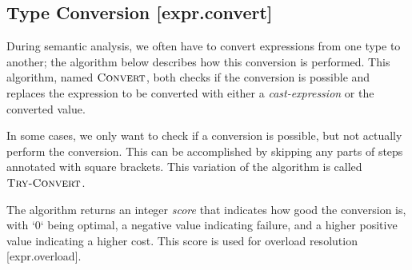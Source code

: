 \documentclass[a4paper, 12pt, oneside, final]{article}
\def\alg#1{\ensuremath{\text{\scshape #1}}}
\def\sref[#1]{[#1]}
\begin{document}
\subsection{Type Conversion [expr.convert]}
During semantic analysis, we often have to convert expressions from one type to another; the algorithm below
describes how this conversion is performed. This algorithm, named \alg{Convert}, both checks if the conversion
is possible and replaces the expression to be converted with either a \emph{cast-expression} or the converted value.

In some cases, we only want to check if a conversion is possible, but not actually perform the conversion. This can
be accomplished by skipping any parts of steps annotated with square brackets. This variation of the algorithm is called
\alg{Try-Convert}.

The algorithm returns an integer \emph{score} that indicates how good the conversion is, with `0` being optimal,
a negative value indicating failure, and a higher positive value indicating a higher cost. This score is used for
overload resolution \sref[expr.overload].
\end{document}
